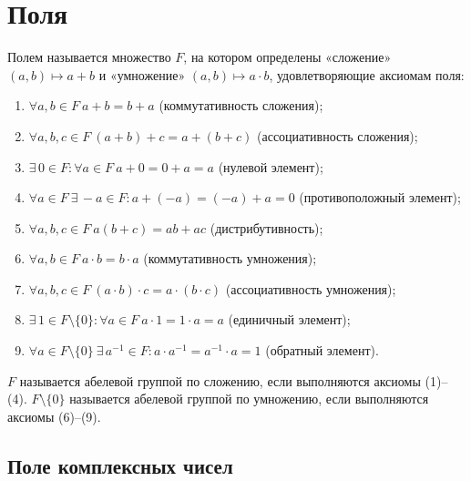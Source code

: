 \documentclass[12pt]{article}
\begin{document}
\section{Поля}

\begin{definition}
	Полем называется множество $F$, на котором определены «сложение»\\
	$(a,b)\mapsto a+b$ и «умножение» $(a,b)\mapsto a\cdot b$,
	удовлетворяющие аксиомам поля:
	\begin{center}
		\begin{minipage}{0.75\textwidth}
			\begin{enumerate}[itemsep=0pt]
				\item $\forall a, b\in F\ a+b=b+a$ (коммутативность сложения);
				\item $\forall a, b, c\in F\ (a+b)+c=a+(b+c)$ (ассоциативность сложения);
				\item $\exists\,0\in F\colon \forall a\in F\ a+0=0+a=a$ (нулевой элемент);
				\item $\forall a\in F\ \exists\,-a\in F\colon a+(-a)=(-a)+a=0$
					(противоположный элемент);
				\item $\forall a, b, c\in F\ a(b+c)=ab+ac$ (дистрибутивность);
				\item $\forall a,b\in F\ a\cdot b=b\cdot a$ (коммутативность умножения);
				\item $\forall a, b, c\in F\ (a\cdot b)\cdot c=a\cdot (b\cdot c)$
					(ассоциативность умножения);
				\item $\exists\,1\in F\setminus\{0\}\colon\forall a\in
					F\ a\cdot1=1\cdot a=a$ (единичный элемент);
				\item $\forall a\in F\setminus\{0\}\ \exists\,a^{-1}\in F\colon
					a\cdot a^{-1}=a^{-1}\cdot a=1$ (обратный элемент).
			\end{enumerate}
		\end{minipage}
	\end{center}
	$F$ называется абелевой группой по сложению, если выполняются
	аксиомы (1)--(4). $F\setminus\{0\}$ называется абелевой группой по
	умножению, если выполняются аксиомы (6)--(9).
\end{definition}

\subsection{Поле комплексных чисел}
\end{document}
